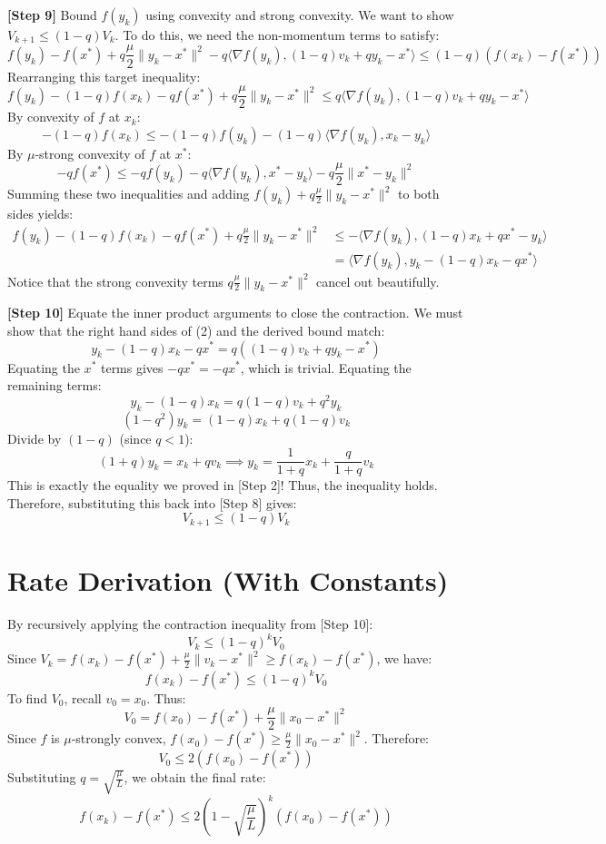 \documentclass[11pt]{article}
\begin{document}
\textbf{[Step 9]} Bound $f(y_k)$ using convexity and strong convexity.
We want to show $V_{k+1} \le (1-q)V_k$. To do this, we need the non-momentum terms to satisfy:
\begin{equation}
    f(y_k) - f(x^*) + q\frac{\mu}{2}\|y_k - x^*\|^2 - q\langle \nabla f(y_k), (1-q)v_k + qy_k - x^* \rangle \le (1-q)(f(x_k) - f(x^*))
\end{equation}
Rearranging this target inequality:
\begin{equation}
    f(y_k) - (1-q)f(x_k) - qf(x^*) + q\frac{\mu}{2}\|y_k - x^*\|^2 \le q\langle \nabla f(y_k), (1-q)v_k + qy_k - x^* \rangle
\end{equation}
By convexity of $f$ at $x_k$:
$$- (1-q)f(x_k) \le - (1-q)f(y_k) - (1-q)\langle \nabla f(y_k), x_k - y_k \rangle$$
By $\mu$-strong convexity of $f$ at $x^*$:
$$- qf(x^*) \le - qf(y_k) - q\langle \nabla f(y_k), x^* - y_k \rangle - q\frac{\mu}{2}\|x^* - y_k\|^2$$
Summing these two inequalities and adding $f(y_k) + q\frac{\mu}{2}\|y_k - x^*\|^2$ to both sides yields:
\begin{align*}
    f(y_k) - (1-q)f(x_k) - qf(x^*) + q\frac{\mu}{2}\|y_k - x^*\|^2 &\le -\langle \nabla f(y_k), (1-q)x_k + qx^* - y_k \rangle \\
    &= \langle \nabla f(y_k), y_k - (1-q)x_k - qx^* \rangle
\end{align*}
Notice that the strong convexity terms $q\frac{\mu}{2}\|y_k - x^*\|^2$ cancel out beautifully.

\textbf{[Step 10]} Equate the inner product arguments to close the contraction.
We must show that the right hand sides of (2) and the derived bound match:
$$y_k - (1-q)x_k - qx^* = q((1-q)v_k + qy_k - x^*)$$
Equating the $x^*$ terms gives $-q x^* = -q x^*$, which is trivial.
Equating the remaining terms:
$$y_k - (1-q)x_k = q(1-q)v_k + q^2 y_k$$
$$(1-q^2)y_k = (1-q)x_k + q(1-q)v_k$$
Divide by $(1-q)$ (since $q < 1$):
$$(1+q)y_k = x_k + qv_k \implies y_k = \frac{1}{1+q}x_k + \frac{q}{1+q}v_k$$
This is exactly the equality we proved in [Step 2]! Thus, the inequality holds.
Therefore, substituting this back into [Step 8] gives:
$$V_{k+1} \le (1-q)V_k$$

\section*{Rate Derivation (With Constants)}
By recursively applying the contraction inequality from [Step 10]:
$$V_k \le (1-q)^k V_0$$
Since $V_k = f(x_k) - f(x^*) + \frac{\mu}{2}\|v_k - x^*\|^2 \ge f(x_k) - f(x^*)$, we have:
$$f(x_k) - f(x^*) \le (1-q)^k V_0$$
To find $V_0$, recall $v_0 = x_0$. Thus:
$$V_0 = f(x_0) - f(x^*) + \frac{\mu}{2}\|x_0 - x^*\|^2$$
Since $f$ is $\mu$-strongly convex, $f(x_0) - f(x^*) \ge \frac{\mu}{2}\|x_0 - x^*\|^2$. Therefore:
$$V_0 \le 2(f(x_0) - f(x^*))$$
Substituting $q = \sqrt{\frac{\mu}{L}}$, we obtain the final rate:
$$f(x_k) - f(x^*) \le 2 \left(1 - \sqrt{\frac{\mu}{L}}\right)^k (f(x_0) - f(x^*))$$
\end{document}
